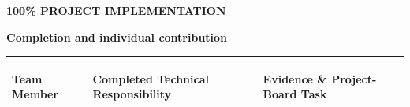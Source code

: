 \documentclass[aspectratio=169, 10pt]{beamer}
\newcommand{\slideheader}[3]{%
        \vspace{-0.25cm}%
        \noindent\begin{minipage}[t]{0.88\linewidth}%
            {\fontsize{7pt}{8.5pt}\selectfont \textbf{\color{BlueAccent}#1}}\par\vspace{1pt}%
            {\fontsize{11.5pt}{13.5pt}\selectfont \textbf{\color{NavyPrimary}#2}}%
        \end{minipage}%
        \hfill%
        \begin{minipage}[t]{0.10\linewidth}%
            \raggedleft{\fontsize{12pt}{14pt}\selectfont \textbf{\color{CoralAccent}#3}}%
        \end{minipage}\par%
        \vspace{2pt}%
        \textcolor{CardBorder}{\rule{\linewidth}{0.6pt}}\par%
        \vspace{3pt}%
    }
\begin{document}
    \begin{frame}[t]                                                                                                                                                                                   
        \slideheader{100\% PROJECT IMPLEMENTATION}{Completion and individual contribution}{16}                                                                                                         
        \vspace{-0.1cm}                                                                                                                                                                                
        \begin{table}[h]                                                                                                                                                                               
            \centering\scriptsize                                                                                                                                                                      
            \begin{tabular}{p{3.2cm}p{5.8cm}p{4.0cm}}                                                                                                                                                  
                \toprule                                                                                                                                                                               
                \rowcolor{NavyPrimary!15} \textbf{Team Member} & \textbf{Completed Technical Responsibility} & \textbf{Evidence \& Project-Board Task} \\                                              
                \midrule                                                                                                                                                                               

\end{tabular}
\end{table}
\end{frame}
\end{document}
